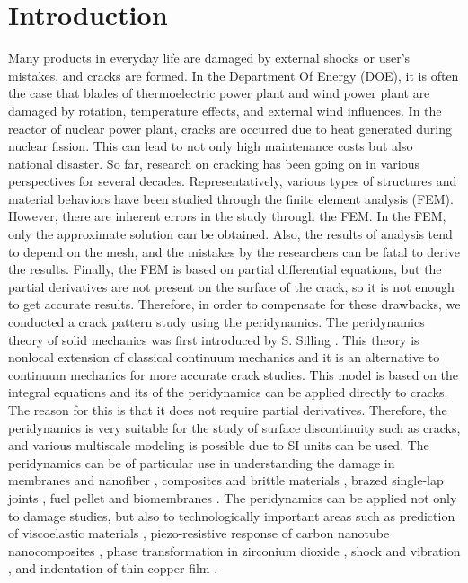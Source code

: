 \section{Introduction}
\label{sec:1}
Many products in everyday life are damaged by external shocks or user's mistakes, and cracks are formed. In the Department Of Energy (DOE), it is often the case that blades of thermoelectric power plant and wind power plant are damaged by rotation, temperature effects, and external wind influences. In the reactor of nuclear power plant, cracks are occurred due to heat generated during nuclear fission. This can lead to not only high maintenance costs but also national disaster. So far, research on cracking has been going on in various perspectives for several decades. Representatively, various types of structures and material behaviors have been studied through the finite element analysis (FEM). However, there are inherent errors in the study through the FEM. In the FEM, only the approximate solution can be obtained. Also, the results of analysis tend to depend on the mesh, and the mistakes by the researchers can be fatal to derive the results. Finally, the FEM is based on partial differential equations, but the partial derivatives are not present on the surface of the crack, so it is not enough to get accurate results. Therefore, in order to compensate for these drawbacks, we conducted a crack pattern study using the peridynamics. The peridynamics theory of solid mechanics was first introduced by S. Silling \cite{Ref1,Ref2,Ref3,Ref4}. This theory is nonlocal extension of classical continuum mechanics and it is an alternative to continuum mechanics for more accurate crack studies. This model is based on the integral equations and its of the peridynamics can be applied directly to cracks. The reason for this is that it does not require partial derivatives. Therefore, the peridynamics is very suitable for the study of surface discontinuity such as cracks, and various multiscale modeling is possible due to SI units can be used. The peridynamics can be of particular use in understanding the damage in membranes and nanofiber \cite{Ref5}, composites and brittle materials \cite{Ref6}, brazed single-lap joints \cite{Ref7}, fuel pellet \cite{Ref8} and biomembranes \cite{Ref9}. The peridynamics can be applied not only to damage studies, but also to technologically important areas such as prediction of viscoelastic materials \cite{Ref10}, piezo-resistive response of carbon nanotube nanocomposites \cite{Ref11}, phase transformation in zirconium dioxide \cite{Ref12}, shock and vibration \cite{Ref13}, and indentation of thin copper film \cite{Ref14}.
